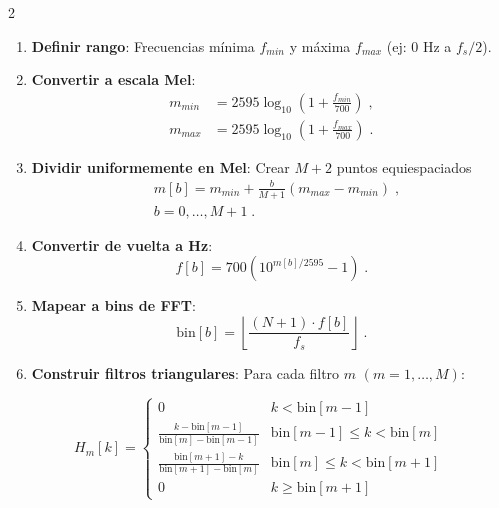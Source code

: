\documentclass[12pt]{report}
\newenvironment{tightmulticols}{%
  \begin{multicols}{2}
  \setlength{\parskip}{1.2pt}
  \linespread{1}\selectfont
}{%
  \end{multicols}
}
\begin{document}
\begin{tightmulticols}
\begin{enumerate}
    \item \textbf{Definir rango}: Frecuencias mínima $f_{min}$ y máxima $f_{max}$ (ej: 0 Hz a $f_s/2$).
    \item \textbf{Convertir a escala Mel}:
    \begin{align*}
        m_{min} &= 2595 \log_{10}\left(1 + \frac{f_{min}}{700}\right) \; , \\[0.6ex]
        m_{max} &= 2595 \log_{10}\left(1 + \frac{f_{max}}{700}\right) \; .
    \end{align*}
    \item \textbf{Dividir uniformemente en Mel}: Crear $M+2$ puntos equiespaciados
    \begin{equation*}
        \begin{split}
        &m[b] = m_{min} + \frac{b}{M+1}(m_{max} - m_{min}) \; , \\[0.6ex]
        &b = 0, \ldots, M+1 \; .
        \end{split}
    \end{equation*}
    \item \textbf{Convertir de vuelta a Hz}:
    \begin{equation*}
        f[b] = 700\left(10^{m[b]/2595} - 1\right) \; .
    \end{equation*}
    \item \textbf{Mapear a bins de FFT}:
    \begin{equation*}
        \text{bin}[b] = \left\lfloor \frac{(N+1) \cdot f[b]}{f_s} \right\rfloor \; .
    \end{equation*}
    \item \textbf{Construir filtros triangulares}: Para cada filtro $m$ $(m = 1, \ldots, M)$:
\end{enumerate}

\end{tightmulticols}
\noindent\makebox[\linewidth]{\rule{\textwidth}{1pt}}
\begin{equation*}
    H_m[k] = \begin{cases}
    0 & k < \text{bin}[m-1] \\[0.6ex]
    \frac{k - \text{bin}[m-1]}{\text{bin}[m] - \text{bin}[m-1]} & \text{bin}[m-1] \leq k < \text{bin}[m] \\[0.6ex]
    \frac{\text{bin}[m+1] - k}{\text{bin}[m+1] - \text{bin}[m]} & \text{bin}[m] \leq k < \text{bin}[m+1] \\[0.6ex]
    0 & k \geq \text{bin}[m+1]
    \end{cases}
\end{equation*}
\noindent\makebox[\linewidth]{\rule{\textwidth}{1pt}}
\end{document}
